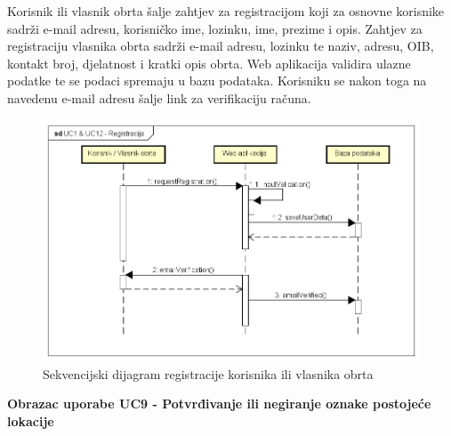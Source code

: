 		Korisnik ili vlasnik obrta šalje zahtjev za registracijom koji za osnovne korisnike sadrži e-mail adresu, korisničko ime, lozinku, ime, prezime i opis. Zahtjev za registraciju vlasnika obrta sadrži e-mail adresu, lozinku te naziv, adresu, OIB, kontakt broj, djelatnost i kratki opis obrta. Web aplikacija validira ulazne podatke te se podaci spremaju u bazu podataka. Korisniku se nakon toga na navedenu e-mail adresu šalje link za verifikaciju računa.
			\begin{figure}[H]
				\centering
				\includegraphics[width=\textwidth]{img/UC1&UC12-Registracija.png}
				\caption{Sekvencijski dijagram registracije korisnika ili vlasnika obrta}
			\end{figure}
			
			\pagebreak \noindent \textbf{Obrazac uporabe UC9 - Potvrđivanje ili negiranje oznake postojeće lokacije}
			
